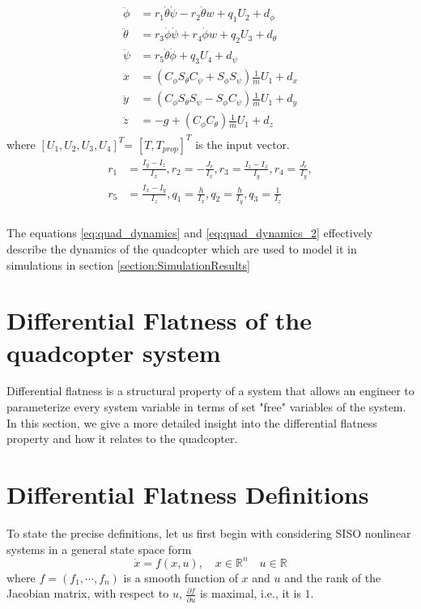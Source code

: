 \documentclass[letterpaper%
, twoside%
, 12pt%
,memoire%
, english%
,creativecommons,hyperref%
]{thETS}
\theoremstyle{newThmStyle}
\begin{document}
\begin{align}\label{eq:quad_dynamics}
\begin{aligned}
\ddot{\phi}&=r_1\dot{\theta}\dot{\psi}-r_2\dot{\theta}w+q_1U_2+d_\phi\\
\ddot{\theta}&=r_3\dot{\phi}\dot{\psi}+r_4\dot{\phi}w+
q_2U_3+d_\theta\\
\ddot{\psi}&=r_5\dot{\theta}\dot{\phi}+q_3U_4+d_\psi\\
\ddot{x}&=(C_{\phi}S_{\theta}C_{\psi}+S_{\phi}S_{\psi})\frac{1}{m}U_1+d_x\\
\ddot{y}&=(C_{\phi}S_{\theta}S_{\psi}-S_{\phi}C_{\psi})\frac{1}{m}U_1+d_y\\
\ddot{z}&=-g+(C_{\phi}C_{\theta})\frac{1}{m}U_1+d_z
\end{aligned}
\end{align}
where $[U_{1},U_{2},U_{3},U_{4}]^{T}$= $[T, T_{prop}]^T$ is the input vector.
\begin{align}\label{eq:quad_dynamics_2}
\begin{aligned}
r_{1}&=\frac{I_{y}-I_{z}}{I_{x}},
r_{2}=-\frac{J_{r}}{I_{x}},
r_{3}=\frac{I_{z}-I_{x}}{I_{y}},
r_{4}=\frac{J_{r}}{I_{y}},\\
r_{5}&=\frac{I_{x}-I_{y}}{I_{z}},
q_{1}=\frac{h}{I_{x}},
q_{2}=\frac{h}{I_{y}},
q_{3}=\frac{1}{I_{z}}
\end{aligned}
\end{align}\\
The equations \eqref{eq:quad_dynamics} and \eqref{eq:quad_dynamics_2} effectively describe the dynamics of the quadcopter which are used to model it in simulations in section \ref{section:SimulationResults}

\section{Differential Flatness of the quadcopter system}
Differential flatness is a structural property of a system that allows an engineer to parameterize every system variable in terms of set "free" variables of the system. In this section, we give a more detailed insight into the differential flatness property and how it relates to the quadcopter.

\section{Differential Flatness Definitions}
To state the precise definitions, let us first begin with considering SISO nonlinear systems in a general state space form
\begin{equation} \label{eqn:state_space}
	\dot{x}=f(x,u),\quad x\in \mathbb{R}^{n}\quad u \in \mathbb{R}
\end{equation}
where $f=(f_1,\cdots,f_n)$ is a smooth function of $x$ and $u$ and the rank of the Jacobian matrix, with respect to $u$, $\frac{\partial f}{\partial u}$ is maximal, i.e., it is $1$. 
\end{document}
